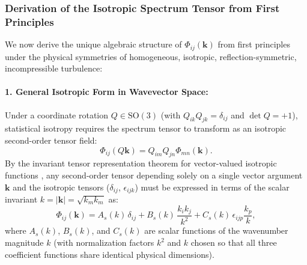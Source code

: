 \documentclass[lineno]{jfm}
\begin{document}
\subsubsection{Derivation of the Isotropic Spectrum Tensor from First Principles}
We now derive the unique algebraic structure of $\Phi_{ij}(\mathbf{k})$ from first principles under the physical symmetries of homogeneous, isotropic, reflection-symmetric, incompressible turbulence:

\paragraph{1. General Isotropic Form in Wavevector Space:}
Under a coordinate rotation $Q \in \mathrm{SO}(3)$ (with $Q_{ik} Q_{jk} = \delta_{ij}$ and $\det Q = +1$), statistical isotropy requires the spectrum tensor to transform as an isotropic second-order tensor field:
\begin{equation}
\Phi_{ij}(Q\mathbf{k}) = Q_{im} Q_{jn} \Phi_{mn}(\mathbf{k}).
\label{eq:Phi_rotation}
\end{equation}
By the invariant tensor representation theorem for vector-valued isotropic functions \citep{Robertson1940, Batchelor1953}, any second-order tensor depending solely on a single vector argument $\mathbf{k}$ and the isotropic tensors ($\delta_{ij}$, $\epsilon_{ijk}$) must be expressed in terms of the scalar invariant $k = |\mathbf{k}| = \sqrt{k_m k_m}$ as:
\begin{equation}
\Phi_{ij}(\mathbf{k}) = A_s(k)\,\delta_{ij} + B_s(k)\,\frac{k_i k_j}{k^2} + C_s(k)\,\epsilon_{ijp} \frac{k_p}{k},
\label{eq:Phi_general}
\end{equation}
where $A_s(k)$, $B_s(k)$, and $C_s(k)$ are scalar functions of the wavenumber magnitude $k$ (with normalization factors $k^2$ and $k$ chosen so that all three coefficient functions share identical physical dimensions).
\end{document}
